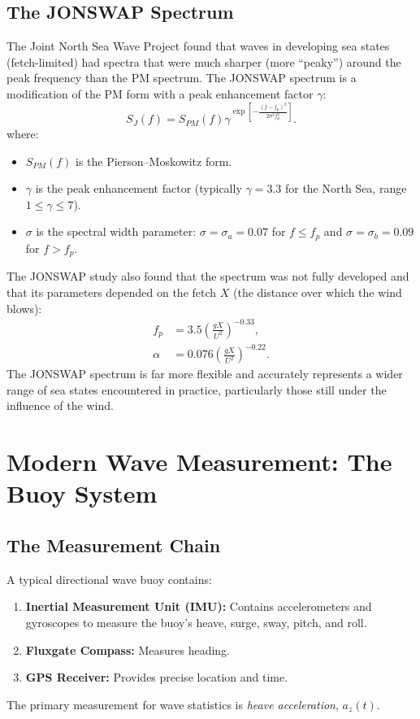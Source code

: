 \documentclass[journal,10pt,twocolumn]{IEEEtran}
\def\text#1{#1}%
\def\cdot{}%
\begin{document}
    \subsection{The JONSWAP Spectrum}
    The Joint North Sea Wave Project found that waves in developing sea states (fetch-limited) had spectra that were much sharper (more ``peaky'') around the peak frequency than the PM spectrum. The JONSWAP spectrum is a modification of the PM form with a peak enhancement factor $\gamma$:
    \begin{equation}
        S_{\text{J}}(f) = S_{\text{PM}}(f)\cdot \gamma^{\exp\left[-\frac{(f-f_p)^2}{2\sigma^2 f_p^2}\right]}.
    \end{equation}
    where:
    \begin{itemize}[leftmargin=1.4em]
        \item $S_{\text{PM}}(f)$ is the Pierson--Moskowitz form.
        \item $\gamma$ is the peak enhancement factor (typically $\gamma=3.3$ for the North Sea, range $1 \leq \gamma \leq 7$).
        \item $\sigma$ is the spectral width parameter: $\sigma = \sigma_a = 0.07$ for $f \leq f_p$ and $\sigma = \sigma_b = 0.09$ for $f > f_p$.
    \end{itemize}
    The JONSWAP study also found that the spectrum was not fully developed and that its parameters depended on the fetch $X$ (the distance over which the wind blows):
    \begin{align}
        f_p &= 3.5 \left( \frac{gX}{U^2} \right)^{-0.33},\\
        \alpha &= 0.076 \left( \frac{gX}{U^2} \right)^{-0.22}.
    \end{align}
    The JONSWAP spectrum is far more flexible and accurately represents a wider range of sea states encountered in practice, particularly those still under the influence of the wind.

    \section{Modern Wave Measurement: The Buoy System}

    \subsection{The Measurement Chain}
    A typical directional wave buoy contains:
    \begin{enumerate}[leftmargin=1.5em]
        \item \textbf{Inertial Measurement Unit (IMU):} Contains accelerometers and gyroscopes to measure the buoy's heave, surge, sway, pitch, and roll.
        \item \textbf{Fluxgate Compass:} Measures heading.
        \item \textbf{GPS Receiver:} Provides precise location and time.
    \end{enumerate}
    The primary measurement for wave statistics is \textit{heave acceleration}, $a_z(t)$.
\end{document}
